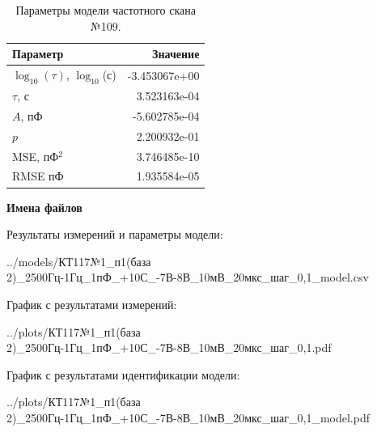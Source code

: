\begin{table}[!ht]
    \centering
    \caption{Параметры модели частотного скана №109.}
    \begin{tabular}{|l|r|}
        \hline
        Параметр                                       & Значение                  \\ \hline
        $\log_{10}(\tau)$, $\log_{10}$(с)              & -3.453067e+00             \\ \hline
        $\tau$, с                                      & 3.523163e-04              \\ \hline
        $A$, пФ                                        & -5.602785e-04             \\ \hline
        $p$                                            & 2.200932e-01              \\ \hline
        MSE, пФ$^2$                                    & 3.746485e-10              \\ \hline
        RMSE пФ                                        & 1.935584e-05              \\ \hline
    \end{tabular}
    \label{table:frequency_scan_model_109}
\end{table}

\textbf{Имена файлов}

Результаты измерений и параметры модели:

\scriptsize../models/КТ117№1\_п1(база 2)\_2500Гц-1Гц\_1пФ\_+10С\_-7В-8В\_10мВ\_20мкс\_шаг\_0,1\_model.csv
\normalsize

График с результатами измерений:

\scriptsize../plots/КТ117№1\_п1(база 2)\_2500Гц-1Гц\_1пФ\_+10С\_-7В-8В\_10мВ\_20мкс\_шаг\_0,1.pdf
\normalsize

График с результатами идентификации модели:

\scriptsize../plots/КТ117№1\_п1(база 2)\_2500Гц-1Гц\_1пФ\_+10С\_-7В-8В\_10мВ\_20мкс\_шаг\_0,1\_model.pdf
\normalsize

